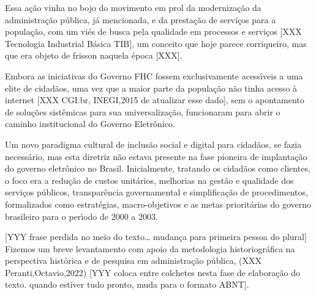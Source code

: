 \documentclass[
12pt,		%
openright,	%
twoside,  %
a4paper,			%
chapter=TITLE,		%
english,			%
french,				%
spanish,			%
brazil				%
]{USPSC-classe/USPSC}
\begin{document}
Essa a\c{c}\~ao vinha no bojo do movimento em prol da moderniza\c{c}\~ao da administra\c{c}\~ao p\'ublica, j\'a mencionada, e da presta\c{c}\~ao de servi\c{c}os para a popula\c{c}\~ao, com um vi\'es de busca pela \textquotedbl qualidade em processos e servi\c{c}os [XXX Tecnologia Industrial B\'asica TIB], um conceito que hoje parece corriqueiro, mas que era objeto de frisson naquela \'epoca [XXX].














Embora as iniciativas do Governo FHC fossem exclusivamente acess\'{\i}veis a uma elite de cidad\~aos, uma vez que a maior parte da popula\c{c}\~ao n\~ao tinha acesso \`a internet [XXX CGI.br, INEGI,2015 de atualizar esse dado], sem o apontamento de solu\c{c}\~oes sist\^emicas para sua universaliza\c{c}\~ao, funcionaram para abrir o caminho institucional do Governo Eletr\^onico.














Um novo paradigma cultural de inclus\~ao social e digital para cidad\~aos, se fazia necess\'ario, mas esta diretriz n\~ao estava presente na fase pioneira de implanta\c{c}\~ao do governo eletr\^onico no Brasil. Inicialmente, tratando os cidad\~aos como clientes, o foco era a redu\c{c}\~ao de custos unit\'arios, melhorias na gest\~ao e qualidade dos servi\c{c}os p\'ublicos, transpar\^encia governamental e simplifica\c{c}\~ao de procedimentos, formalizados como estrat\'egias, macro-objetivos e  as metas priorit\'arias  do governo brasileiro para o per\'{\i}odo de 2000 a 2003.














[YYY frase perdida no meio do texto… mudan\c{c}a para primeira pessoa do plural] Fizemos um breve levantamento com apoio da metodologia historiogr\'afica na  perspectiva hist\'orica e de pesquisa em administra\c{c}\~ao p\'ublica, (XXX Peranti,Octavio,2022) [YYY coloca entre colchetes nesta fase de elabora\c{c}\~ao do texto. quando estiver tudo pronto, muda para o formato ABNT].
\end{document}
